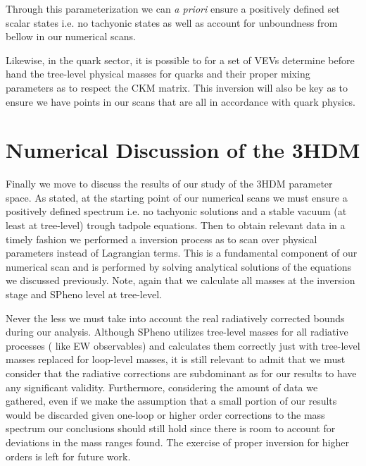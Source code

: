 \documentclass[10pt]{book}
\renewcommand{\(}{\left(}
\renewcommand{\)}{\right)}
\renewcommand{\[}{\left[}
\renewcommand{\]}{\right]}
\begin{document}
Through this parameterization we can \textit{a priori} ensure a positively defined set scalar states i.e. no tachyonic states as well as account for unboundness from bellow in our numerical scans. 

Likewise, in the quark sector, it is possible to for a set of VEVs determine before hand the tree-level physical masses for quarks and their proper mixing parameters as to respect the CKM matrix. 
%
This inversion will also be key as to ensure we have points in our scans that are all in accordance with quark physics. 

\section{Numerical Discussion of the 3HDM} 

Finally we move to discuss the results of our study of the 3HDM parameter space.
%
%
As stated, at the starting point of our numerical scans we must ensure a positively defined spectrum i.e. no tachyonic solutions and a stable vacuum (at least at tree-level) trough tadpole equations. %
% 
% 
Then to obtain relevant data in a timely fashion we performed a inversion process as to scan over physical parameters instead of Lagrangian terms.  
% 
This is a fundamental component of our numerical scan and is performed by solving analytical solutions of the equations we discussed previously. 
%
%
Note, again that we calculate all masses at the inversion stage and SPheno level at tree-level.  

Never the less we must take into account the real radiatively corrected bounds during our analysis. 
%
Although SPheno utilizes tree-level masses for all radiative processes ( like EW observables) and calculates them correctly just with tree-level masses replaced for loop-level masses, it is still relevant to admit that we must consider that the radiative corrections are subdominant as for our results to have any significant validity.
%
Furthermore, considering the amount of data we gathered, even if we make the assumption that a small portion of our results would be discarded given one-loop or higher order corrections to the mass spectrum our conclusions should still hold since there is room to account for deviations in the mass ranges found.
% 
The exercise of proper inversion for higher orders is left for future work.
\end{document}
